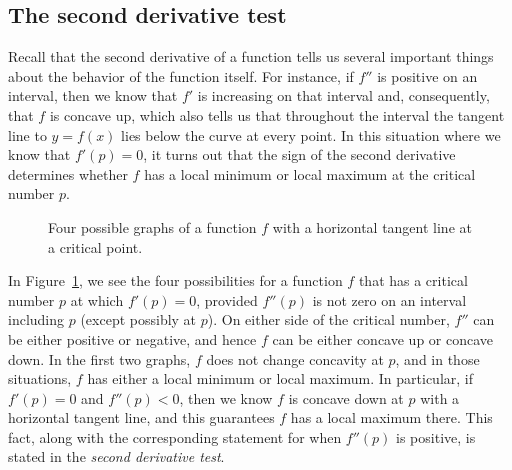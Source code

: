 \afterex



\subsection*{The second derivative test}

Recall that the second derivative of a function tells us several important things about the behavior of the function itself.  For instance, if $f''$ is positive on an interval, then we know that $f'$ is increasing on that interval and, consequently, that $f$ is concave up, which also tells us that throughout the interval the tangent line to $y = f(x)$ lies below the curve at every point.  In this situation where we know that $f'(p) = 0$, it turns out that the sign of the second derivative determines whether $f$ has a local minimum or local maximum at the critical number $p$.

\begin{figure}[h]
\begin{center}
\caption{Four possible graphs of a function $f$ with a horizontal tangent line at a critical point.} \label{F:3.1.2Dtest}
\end{center}
\end{figure}

In Figure~\ref{F:3.1.2Dtest}, we see the four possibilities for a function $f$ that has a critical number $p$ at which $f'(p) = 0$, provided $f''(p)$ is not zero on an interval including $p$ (except possibly at $p$).  On either side of the critical number, $f''$ can be either positive or negative, and hence $f$ can be either concave up or concave down.  In the first two graphs, $f$ does not change concavity at $p$, and in those situations, $f$ has either a local minimum or local maximum.  In particular, if $f'(p) = 0$ and $f''(p) < 0$, then we know $f$ is concave down at $p$ with a horizontal tangent line, and this guarantees $f$ has a local maximum there.  This fact, along with the corresponding statement for when $f''(p)$ is positive, is stated in the \emph{second derivative test}. 

